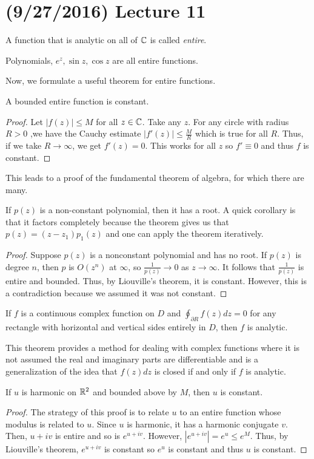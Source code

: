 \documentclass[11pt,leqno,oneside]{amsart}
\numberwithin{thm}{section}
\begin{document}
  \section{(9/27/2016) Lecture 11}
  \begin{defn}
    A function that is analytic on all of ${\mathbb C}$ is called \emph{entire}.
  \end{defn}
  \begin{example}
    Polynomials, $e^z, \sin z, \cos z$ are all entire functions.
  \end{example}
  Now, we formulate a useful theorem for entire functions.
  \begin{thm}
    A bounded entire function is constant.
  \end{thm}
  \begin{proof}
    Let $|f(z)| \leq M$ for all $z \in {\mathbb C}$. Take any $z$. For any
    circle with radius $R >
    0$ ,we have the Cauchy estimate $|f'(z)| \leq \frac{M}{R}$ which
    is true for all $R$. Thus, if we take $R \to \infty$, we get
    $f'(z) = 0$. This works for all $z$ so $f' \equiv 0$ and thus $f$
    is constant.
  \end{proof}
  This leads to a proof of the fundamental theorem of algebra, for
  which there are many.
  \begin{thm}
    If $p(z)$ is a non-constant polynomial, then it has a root. A
    quick corollary is that it factors completely because the theorem
    gives us that $p(z) = (z-z_1)p_1(z)$ and one can apply the theorem iteratively.
  \end{thm}
  \begin{proof}
    Suppose $p(z)$ is a nonconstant polynomial and has no root. If
    $p(z)$ is degree $n$, then $p$ is $O(z^n)$ at $\infty$, so
    $\frac{1}{p(z)} \to 0$ as $z \to \infty$. It follows that
    $\frac{1}{p(z)}$ is entire and bounded. Thus, by Liouville's
    theorem, it is constant. However, this is a contradiction because
    we assumed it was not constant.
  \end{proof}
  \begin{thm}
    If $f$ is a continuous complex function on $D$ and
    $\oint_{\partial R} f(z)dz = 0$ for any rectangle with horizontal
    and vertical sides entirely in $D$, then $f$ is analytic.
  \end{thm}
  This theorem provides a method for dealing with complex functions
  where it is not assumed the real and imaginary parts are
  differentiable and is a generalization of the idea that $f(z)dz$ is
  closed if and only if $f$ is analytic.
  \begin{thm}
    If $u$ is harmonic on ${\mathbb R}^2$ and bounded above by $M$, then $u$ is
    constant.
  \end{thm}
  \begin{proof}
    The strategy of this proof is to relate $u$ to an entire function
    whose modulus is related to $u$. Since $u$ is harmonic, it has a
    harmonic conjugate $v$. Then, $u+iv$ is entire and so is
    $e^{u+iv}$. However, $|e^{u+iv}| = e^u \leq e^M$. Thus, by
    Liouville's theorem, $e^{u+iv}$ is constant so $e^u$ is constant
    and thus $u$ is constant.
  \end{proof}
\end{document}
